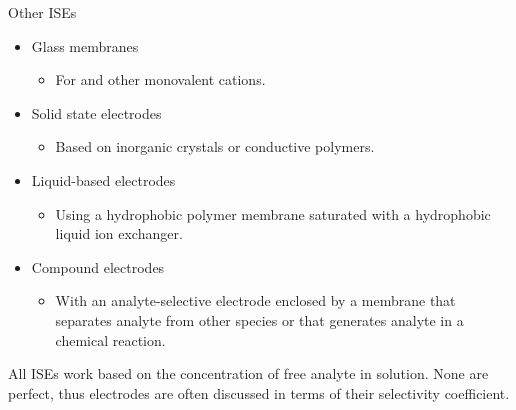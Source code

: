 \documentclass[notes=show]{beamer}
\begin{document}
\begin{frame}{Other ISEs}
	\begin{itemize}
		\item Glass membranes
			\begin{itemize}
				\item For  and other monovalent cations.
			\end{itemize}
		\item Solid state electrodes
			\begin{itemize}
				\item Based on inorganic crystals or conductive
					polymers.
			\end{itemize}
		\item Liquid-based electrodes
			\begin{itemize}
				\item Using a hydrophobic polymer membrane
					saturated with a hydrophobic liquid ion
					exchanger.
			\end{itemize}
		\item Compound electrodes
			\begin{itemize}
				\item With an analyte-selective electrode
					enclosed by a membrane that separates
					analyte from other species or that
					generates analyte in a chemical
					reaction.
			\end{itemize}
	\end{itemize}

	All ISEs work based on the concentration of \alert{free} analyte in
	solution. None are perfect, thus electrodes are often discussed in terms
	of their \alert{selectivity coefficient}.

	\end{frame}
\end{document}
